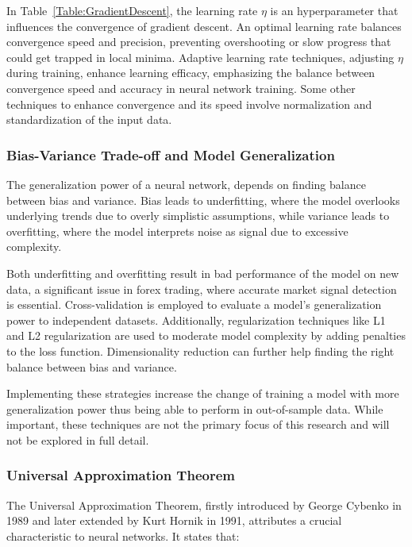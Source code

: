 

In Table~\ref{Table:GradientDescent}, the learning rate \( \eta \) is an hyperparameter that influences the convergence of gradient descent. An optimal learning rate balances convergence speed and precision, preventing overshooting or slow progress that could get trapped in local minima. Adaptive learning rate techniques, adjusting \( \eta \) during training, enhance learning efficacy, emphasizing the balance between convergence speed and accuracy in neural network training. Some other techniques to enhance convergence and its speed involve normalization and standardization of the input data.

\subsubsection{Bias-Variance Trade-off and Model Generalization}
The generalization power of a neural network, depends on finding balance between bias and variance. Bias leads to underfitting, where the model overlooks underlying trends due to overly simplistic assumptions, while variance leads to overfitting, where the model interprets noise as signal due to excessive complexity.

Both underfitting and overfitting result in bad performance of the model on new data, a significant issue in forex trading, where accurate market signal detection is essential. Cross-validation is employed to evaluate a model's generalization power to independent datasets. Additionally, regularization techniques like L1 and L2 regularization are used to moderate model complexity by adding penalties to the loss function. Dimensionality reduction can further help finding the right balance between bias and variance.

Implementing these strategies increase the change of training a model with more generalization power thus being able to perform in out-of-sample data. While important, these techniques are not the primary focus of this research and will not be explored in full detail.

\subsubsection{Universal Approximation Theorem}
The Universal Approximation Theorem, firstly introduced by George Cybenko in 1989 and later extended by Kurt Hornik in 1991, attributes a crucial characteristic to neural networks. It states that:

